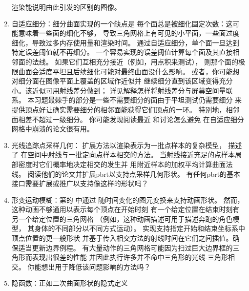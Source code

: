 \begin{enumerate}
          渲染能说明由此引发的区别的图像。
    \item \circlethree 自适应细分：细分曲面实现的一个缺点是
          每个面总是被细化固定次数：这可能意味着一些面的细化不够，
          导致三角网格上有可见的小平面，一些面过度细化，导致过多内存使用量和渲染时间。
          通过自适应细分，单个面一旦达到特定误差阈值就不再细分。
          一个容易实现的误差阈值计算每个面及其直接相邻面的法线。
          如果它们互相充分接近（例如，用点积来测试），
          则那个面的极限曲面会适度平坦且后续细化可能对最终曲面没什么影响。
          或者，你可能想对细分面在图像平面上覆盖的区域作近似并
          继续细分直到该区域变得充分小。该近似可用射线差分做到；
          详见解释怎样将射线差分与屏幕空间量联系。
          本习题最棘手的部分是一些不需要细分的面由于平坦测试仍需要细分
          来提供顶点好让确实需要细分的相邻面能获得它们顶点的一环。
          特别地，相邻面相差不超过一级细分。
          你可能发现阅读最近\citet{10.1145/1572769.1572785}
          和\citet{10.1145/1661412.1618496}讨论怎么避免
          在自适应细分网格中崩溃的论文很有用。
    \item \circlethree 光线追踪点采样几何：
          扩展方法以渲染表示为一批点样本的复杂模型\citep{10.1111/1467-8659.t01-2-00647,10.1145/344779.344936,10.1145/344779.344940}，
          \citet{10.1007/978-3-7091-6303-0_29}描述了
          在空间中射线与一批定向点样本相交的方法。
          当射线接近充足的点样本局部密度时它们概率地决定相交的发生并
          用附近样本的加权平均计算曲面法线。
          阅读他们的论文并扩展pbrt以支持点采样几何形状。
          有任何pbrt的基本接口需要扩展或推广以支持像这样的形状吗？
    \item \circlethree 形变运动模糊：第的
          中通过
          随时间变化的图元变换来支持动画形状。
          然而，这种动画不够通用以表示每个顶点在开始时刻
          有一个给定位置在结束时刻有另一个给定位置的三角网格
          （例如，这种动画描述可用于描述奔跑的角色模型，
          其身体的不同部分以不同方式运动）。
          实现支持指定开始和结束坐标系中顶点位置的更一般形状
          并基于传入相交方法的射线时间在它们之间插值。确保适当更新边界例程。
          有大量动作的三角网格可能因为扫过巨大边界框的三角形而表现出很差的性能
          并因此执行许多并不命中三角形的光线-三角形相交。
          你能想出用于降低该问题影响的方法吗？
    \item \circlethree 隐函数：正如二次曲面形状的隐式定义

\end{enumerate}
